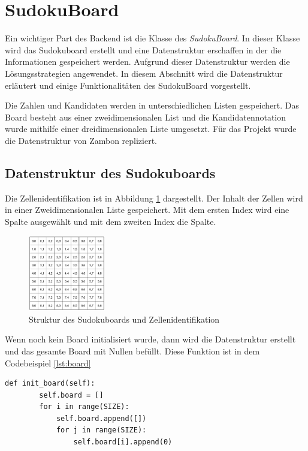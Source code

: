 \section{SudokuBoard}

Ein wichtiger Part des Backend ist die Klasse des \textit{SudokuBoard}. In dieser Klasse wird das Sudokuboard erstellt und eine Datenstruktur erschaffen in der die Informationen gespeichert werden. Aufgrund dieser Datenstruktur werden die Lösungsstrategien angewendet. In diesem Abschnitt wird die Datenstruktur erläutert und einige Funktionalitäten des SudokuBoard vorgestellt.

Die Zahlen und Kandidaten werden in unterschiedlichen Listen gespeichert. Das Board besteht aus einer zweidimensionalen List und die Kandidatennotation wurde mithilfe einer dreidimensionalen Liste umgesetzt. Für das Projekt wurde die Datenstruktur von Zambon \cite{zambon2015sudoku} repliziert. 

\subsection{Datenstruktur des Sudokuboards}
Die Zellenidentifikation ist in Abbildung \ref{fig:Sudokugitter} dargestellt. Der Inhalt der Zellen wird in einer Zweidimensionalen Liste gespeichert. Mit dem ersten Index wird eine Spalte ausgewählt und mit dem zweiten Index die Spalte. 

\begin{figure}[htbp]
	\centering
	\includegraphics[width=0.3\textwidth]{images/board.png}
	\caption{Struktur des Sudokuboards und Zellenidentifikation \cite{zambon2015sudoku}}
	\label{fig:Sudokugitter}
\end{figure}

Wenn noch kein Board initialisiert wurde, dann wird die Datenstruktur erstellt und das gesamte Board mit Nullen befüllt. Diese Funktion ist in dem Codebeispiel \ref{lst:board} 

\begin{lstlisting}[caption={Initalisierung des Boards}, label={lst:board}]
	def init_board(self):
		self.board = []
		for i in range(SIZE):
			self.board.append([])
			for j in range(SIZE):
				self.board[i].append(0)
\end{lstlisting}

